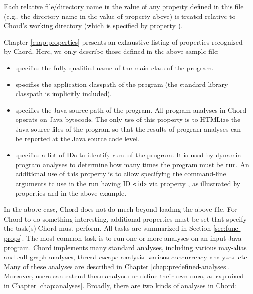Each relative file/directory name in the value of any property
defined in this file (e.g., the  directory name in the value of
property  above) is treated relative to Chord's working directory
(which is specified by property ).

Chapter \ref{chap:properties} presents an exhaustive listing of
properties recognized by Chord.  Here, we only describe those defined
in the above sample  file:

\begin{itemize}
\item
{} specifies the fully-qualified name of the main
class of the program.
\item
{} specifies the application classpath
of the program (the standard library classpath is implicitly
included).
\item
{} specifies the Java source path of the program.
All program analyses in Chord operate on Java bytecode.  The only use
of this property is to HTMLize the Java source files of the program so
that the results of program analyses can be reported at the Java
source code level.
\item
{} specifies a list of IDs to identify runs of the
program.  It is used by dynamic program analyses to determine how many
times the program must be run.  An additional use of this property is
to allow specifying the command-line arguments to use in the run
having ID {\tt <id>} via property , as
illustrated by properties  and 
in the above example.
\end{itemize}

In the above case, Chord does not do much beyond loading the above
 file.  For Chord to do something interesting,
additional properties must be set that specify the task(s)
Chord must perform.  All tasks are summarized in Section \ref{sec:func-props}.
The most common task is to run one or more analyses on an input Java program.
Chord implements many standard analyses, including various may-alias and
call-graph analyses, thread-escape analysis, various concurrency analyses,
etc. Many of these analyses are described in Chapter \ref{chap:predefined-analyses}.
Moreover, users can extend these analyses or define their own ones, as
explained in Chapter \ref{chap:analyses}.
Broadly, there are two kinds of analyses in Chord:

